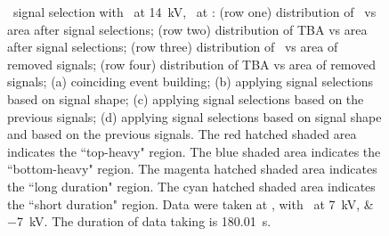 \begin{landscape}
\begin{figure}[!p]
\begin{subfigure}[t]{0.32\textwidth}
			\caption{}
			\label{fig:signal selection dv 14 04}
		\end{subfigure}
		\caption[\gtest\ signal selection with \opdv\ at \SI{14}{\kV}, \opgd\ at \standarddensity .]{\gtest\ signal selection with \opdv\ at \SI{14}{\kV}, \opgd\ at \standarddensity : 
			(row one) distribution of \rpdshort\ vs area after signal selections;
			(row two) distribution of TBA vs area after signal selections;
			(row three) distribution of \rpdshort\ vs area of removed signals;
			(row four) distribution of TBA vs area of removed signals;
			(a) coinciding event building; 
			(b) applying signal selections based on signal shape;
			(c) applying signal selections based on the previous signals;
			(d) applying signal selections based on signal shape and based on the previous signals.
			The red hatched shaded area indicates the ``top-heavy" region.
			The blue shaded area indicates the ``bottom-heavy" region.
			The magenta hatched shaded area indicates the ``long duration" region.
			The cyan hatched shaded area indicates the ``short duration" region.
			Data were taken at , with \opvtvb\ at \SIlist{+7;-7}{kV}. The duration of data taking is \SI{180.01}{\s}.
		}
		\label{fig:signal selection dv 14}
	\end{figure}
\end{landscape}
